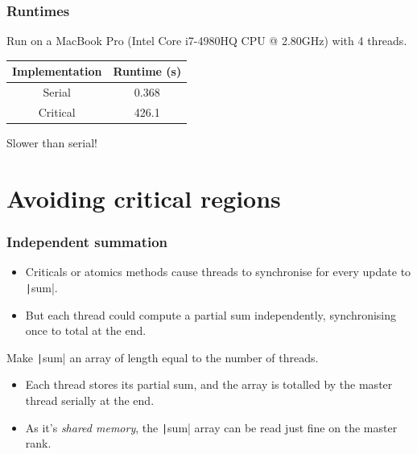 \documentclass[aspectratio=169]{beamer}
\begin{document}
%
\begin{frame}
\frametitle{Runtimes}
Run on a MacBook Pro (Intel Core i7-4980HQ CPU @ 2.80GHz) with 4 threads.

\vfill

\begin{table}
\begin{tabular}{cc}
\toprule
Implementation & Runtime (s) \\
\midrule
Serial   & 0.368 \\
Critical & 426.1 \\
\bottomrule
\end{tabular}
\end{table}


\begin{center}
\large Slower than serial!
\end{center}

\end{frame}

\section{Avoiding critical regions}
\begin{frame}
\frametitle{Independent summation}
\begin{itemize}
  \item Criticals or atomics methods cause threads to synchronise for every update to \texttt|sum|.
  \item But each thread could compute a partial sum independently, synchronising once to total at the end.
\end{itemize}

\vfill

Make \texttt|sum| an array of length equal to the number of threads.
\begin{itemize}
  \item Each thread stores its partial sum, and the array is totalled by the master thread serially at the end.
  \item As it's \emph{shared memory}, the \texttt|sum| array can be read just fine on the master rank.
\end{itemize}
\end{frame}
\end{document}
